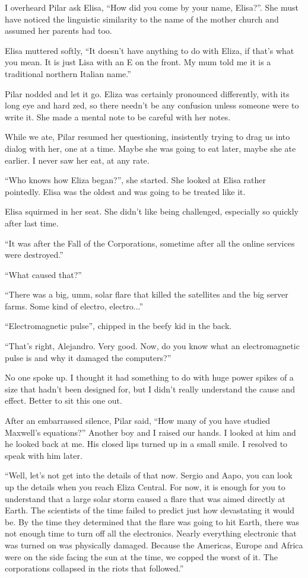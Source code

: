 I overheard Pilar ask Elisa, ``How did you come by your name, Elisa?''. She must have noticed the linguistic similarity to the name of the mother church and assumed her parents had too.

Elisa muttered softly, ``It doesn't have anything to do with Eliza, if that's what you mean. It is just Lisa with an E on the front. My mum told me it is a traditional northern Italian name.''

Pilar nodded and let it go. Eliza was certainly pronounced differently, with its long eye and hard zed, so there needn't be any confusion unless someone were to write it. She made a mental note to be careful with her notes.

While we ate, Pilar resumed her questioning, insistently trying to drag us into dialog with her, one at a time. Maybe she was going to eat later, maybe she ate earlier. I never saw her eat, at any rate.

``Who knows how Eliza began?'', she started. She looked at Elisa rather pointedly. Elisa was the oldest and was going to be treated like it.

Elisa squirmed in her seat. She didn't like being challenged, especially so quickly after last time.

``It was after the Fall of the Corporations, sometime after all the online services were destroyed.''

``What caused that?''

``There was a big, umm, solar flare that killed the satellites and the big server farms. Some kind of electro, electro...''

``Electromagnetic pulse'', chipped in the beefy kid in the back. 

``That's right, Alejandro. Very good. Now, do you know what an electromagnetic pulse is and why it damaged the computers?''

No one spoke up. I thought it had something to do with huge power spikes of a size that hadn't been designed for, but I didn't really understand the cause and effect. Better to sit this one out.

After an embarrassed silence, Pilar said, ``How many of you have studied Maxwell's equations?'' Another boy and I raised our hands. I looked at him and he looked back at me. His closed lips turned up in a small smile. I resolved to speak with him later.

``Well, let's not get into the details of that now. Sergio and Aapo, you can look up the details when you reach Eliza Central. For now, it is enough for you to understand that a large solar storm caused a flare that was aimed directly at Earth. The scientists of the time failed to predict just how devastating it would be. By the time they determined that the flare was going to hit Earth, there was not enough time to turn off all the electronics. Nearly everything electronic that was turned on was physically damaged. Because the Americas, Europe and Africa were on the side facing the sun at the time, we copped the worst of it. The corporations collapsed in the riots that followed.''



